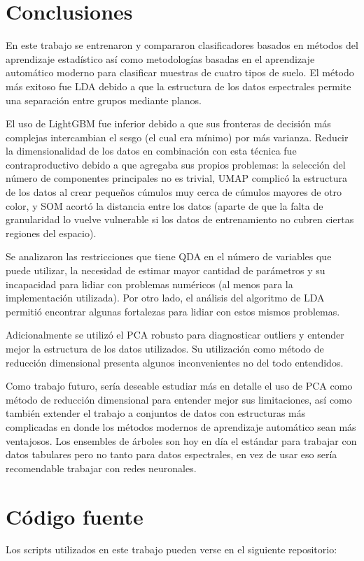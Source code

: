 \documentclass[12pt]{article}
\begin{document}
\section{Conclusiones}
En este trabajo se entrenaron y compararon clasificadores basados en métodos del aprendizaje estadístico así como metodologías basadas en el aprendizaje automático moderno para clasificar muestras de cuatro tipos de suelo. El método más exitoso fue LDA debido a que la estructura de los datos espectrales permite una separación entre grupos mediante planos.

El uso de LightGBM fue inferior debido a que sus fronteras de decisión más complejas intercambian el sesgo (el cual era mínimo) por más varianza. Reducir la dimensionalidad de los datos en combinación con esta técnica fue contraproductivo debido a que agregaba sus propios problemas: la selección del número de componentes principales no es trivial, UMAP complicó la estructura de los datos al crear pequeños cúmulos muy cerca de cúmulos mayores de otro color, y SOM acortó la distancia entre los datos (aparte de que la falta de granularidad lo vuelve vulnerable si los datos de entrenamiento no cubren ciertas regiones del espacio).

Se analizaron las restricciones que tiene QDA en el número de variables que puede utilizar, la necesidad de estimar mayor cantidad de parámetros y su incapacidad para lidiar con problemas numéricos (al menos para la implementación utilizada). Por otro lado, el análisis del algoritmo de LDA permitió encontrar algunas fortalezas para lidiar con estos mismos problemas.

Adicionalmente se utilizó el PCA robusto para diagnosticar outliers y entender mejor la estructura de los datos utilizados. Su utilización como método de reducción dimensional presenta algunos inconvenientes no del todo entendidos.

Como trabajo futuro, sería deseable estudiar más en detalle el uso de PCA como método de reducción dimensional para entender mejor sus limitaciones, así como también extender el trabajo a conjuntos de datos con estructuras más complicadas en donde los métodos modernos de aprendizaje automático sean más ventajosos. Los ensembles de árboles son hoy en día el estándar para trabajar con datos tabulares pero no tanto para datos espectrales, en vez de usar eso sería recomendable trabajar con redes neuronales.
\section{Código fuente}
Los scripts utilizados en este trabajo pueden verse en el siguiente repositorio:
\end{document}

